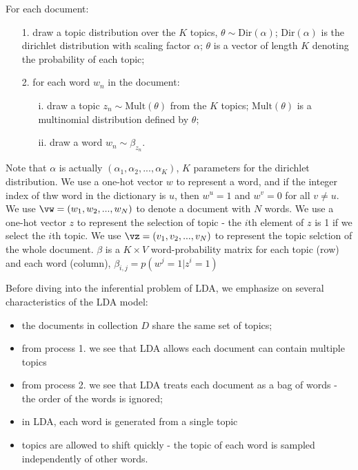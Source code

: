For each document:
\begin{itemize}
    \item[1.] draw a topic distribution over the $K$ topics, $\theta\sim \text{Dir}(\alpha)$; $\text{Dir}(\alpha)$ is the dirichlet distribution with scaling factor $\alpha$; $\theta$ is a vector of length $K$ denoting the probability of each topic;
    \item[2.] for each word $w_n$ in the document:
        \begin{itemize}
            \item[i.] draw a topic $z_n\sim \text{Mult}(\theta)$ from the $K$ topics; $\text{Mult}(\theta)$ is a multinomial distribution defined by $\theta$;
            \item[ii.] draw a word $w_n\sim \beta_{z_n}$.
        \end{itemize}
\end{itemize}

Note that $\alpha$ is actually $(\alpha_1, \alpha_2, ..., \alpha_K)$, $K$ parameters for the dirichlet distribution.
We use a one-hot vector $w$ to represent a word, and if the integer index of thw word in the dictionary is $u$, then $w^u=1$ and $w^v=0$ for all $v\neq u$. We use $\vw=(w_1, w_2, ..., w_N)$ to denote a document with $N$ words.
We use a one-hot vector $z$ to represent the selection of topic - the $i$th element of $z$ is 1 if we select the $i$th topic. We use $\vz=(v_1, v_2, ..., v_N)$ to represent the topic selction of the whole document. $\beta$ is a $K\times V$ word-probability matrix for each topic (row) and each word (column), $\beta_{i,j} = p(w^j=1|z^i=1)$

Before diving into the inferential problem of LDA, we emphasize on several characteristics of the LDA model:

\begin{itemize}
    \item the documents in collection $D$ share the same set of topics;
    \item from process 1. we see that LDA allows each document can contain multiple topics
    \item from process 2. we see that LDA treats each document as a bag of words - the order of the words is ignored;
    \item in LDA, each word is generated from a single topic
    \item topics are allowed to shift quickly - the topic of each word is sampled independently of other words.
\end{itemize}

